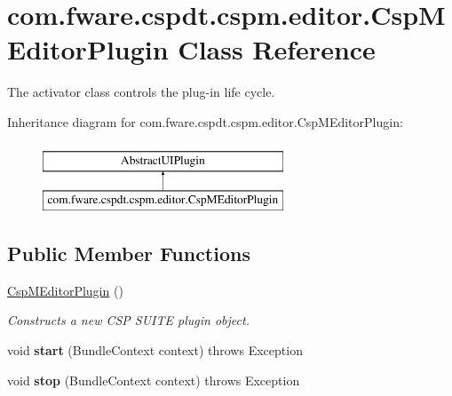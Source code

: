 \hypertarget{classcom_1_1fware_1_1cspdt_1_1cspm_1_1editor_1_1_csp_m_editor_plugin}{}\section{com.\+fware.\+cspdt.\+cspm.\+editor.\+Csp\+M\+Editor\+Plugin Class Reference}
\label{classcom_1_1fware_1_1cspdt_1_1cspm_1_1editor_1_1_csp_m_editor_plugin}


The activator class controls the plug-\/in life cycle.  


Inheritance diagram for com.\+fware.\+cspdt.\+cspm.\+editor.\+Csp\+M\+Editor\+Plugin\+:\begin{figure}[H]
\begin{center}
\leavevmode
\includegraphics[height=2.000000cm]{classcom_1_1fware_1_1cspdt_1_1cspm_1_1editor_1_1_csp_m_editor_plugin}
\end{center}
\end{figure}
\subsection*{Public Member Functions}
\begin{DoxyCompactItemize}
\item 
\mbox{\label{classcom_1_1fware_1_1cspdt_1_1cspm_1_1editor_1_1_csp_m_editor_plugin_a132fdd00e0ab589fd1e0cf2469cb3b88}} 
\hyperlink{classcom_1_1fware_1_1cspdt_1_1cspm_1_1editor_1_1_csp_m_editor_plugin_a132fdd00e0ab589fd1e0cf2469cb3b88}{Csp\+M\+Editor\+Plugin} ()
\begin{DoxyCompactList}\small\item\em Constructs a new C\+SP S\+U\+I\+TE plugin object. \end{DoxyCompactList}\item 
\mbox{\label{classcom_1_1fware_1_1cspdt_1_1cspm_1_1editor_1_1_csp_m_editor_plugin_a8bcd3b653eb143f50f9584e3ba6d426e}} 
void {\bfseries start} (Bundle\+Context context)  throws Exception 
\item 
\mbox{\label{classcom_1_1fware_1_1cspdt_1_1cspm_1_1editor_1_1_csp_m_editor_plugin_aec8977bf750ac404c55cf9e3998c0343}} 
void {\bfseries stop} (Bundle\+Context context)  throws Exception 
\end{DoxyCompactItemize}
